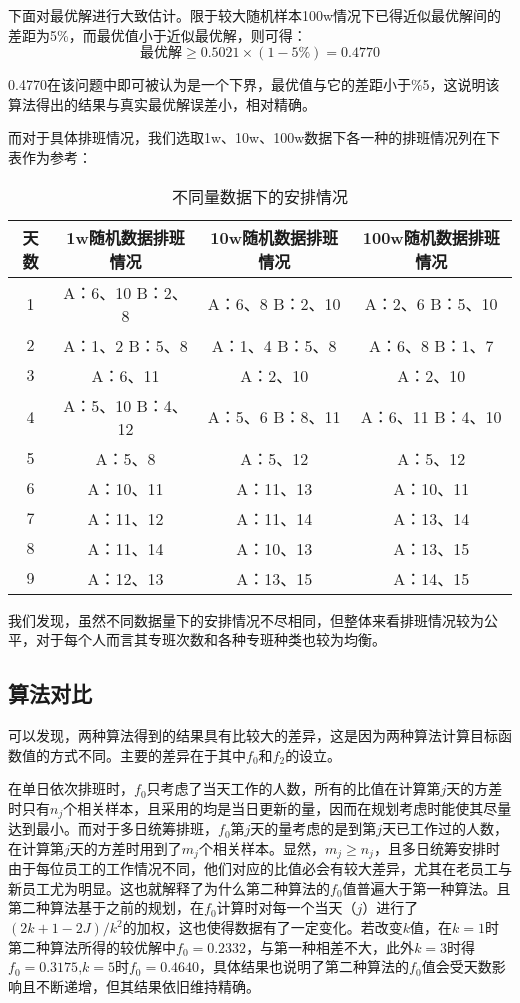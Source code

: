 \documentclass{article}
\begin{document}
	下面对最优解进行大致估计。限于较大随机样本100w情况下已得近似最优解间的差距为5\%，而最优值小于近似最优解，则可得：
	\begin{equation}
		\text{最优解}\geq 0.5021\times(1-5\%)=0.4770
	\end{equation}
	
	0.4770在该问题中即可被认为是一个下界，最优值与它的差距小于\%5，这说明该算法得出的结果与真实最优解误差小，相对精确。


	而对于具体排班情况，我们选取1w、10w、100w数据下各一种的排班情况列在下表作为参考：
	\begin{table}[!h]
		\centering
		\caption{不同量数据下的安排情况}
		\begin{tabular}{|c|c|c|c|}
			\hline
			天数 & 1w随机数据排班情况    & 10w随机数据排班情况  & 100w随机数据排班情况  \\
			\hline
			1  & A：6、10 B：2、8  & A：6、8 B：2、10 & A：2、6 B：5、10  \\
			2  & A：1、2 B：5、8   & A：1、4 B：5、8  & A：6、8 B：1、7   \\
			3  & A：6、11        & A：2、10       & A：2、10        \\
			4  & A：5、10 B：4、12 & A：5、6 B：8、11 & A：6、11 B：4、10 \\
			5  & A：5、8         & A：5、12       & A：5、12        \\
			6  & A：10、11       & A：11、13      & A：10、11       \\
			7  & A：11、12       & A：11、14      & A：13、14       \\
			8  & A：11、14       & A：10、13      & A：13、15       \\
			9  & A：12、13       & A：13、15      & A：14、15      \\
			\hline
		\end{tabular}
	\end{table}
	
	我们发现，虽然不同数据量下的安排情况不尽相同，但整体来看排班情况较为公平，对于每个人而言其专班次数和各种专班种类也较为均衡。
	
	\subsection{算法对比}
	可以发现，两种算法得到的结果具有比较大的差异，这是因为两种算法计算目标函数值的方式不同。主要的差异在于其中$f_0$和$f_2$的设立。
	
	在单日依次排班时，$f_0$只考虑了当天工作的人数，所有的比值在计算第$j$天的方差时只有$n_j$个相关样本，且采用的均是当日更新的量，因而在规划考虑时能使其尽量达到最小。而对于多日统筹排班，$f_0$第$j$天的量考虑的是到第$j$天已工作过的人数，在计算第$j$天的方差时用到了$m_j$个相关样本。显然，$m_j\geq n_j$，且多日统筹安排时由于每位员工的工作情况不同，他们对应的比值必会有较大差异，尤其在老员工与新员工尤为明显。这也就解释了为什么第二种算法的$f_0$值普遍大于第一种算法。且第二种算法基于之前的规划，在$f_0$计算时对每一个当天（$j$）进行了$(2k+1-2J)/k^2$的加权，这也使得数据有了一定变化。若改变$k$值，在$k=1$时第二种算法所得的较优解中$f_0=0.2332$，与第一种相差不大，此外$k=3$时得$f_0=0.3175$,$k=5$时$f_0=0.4640$，具体结果也说明了第二种算法的$f_0$值会受天数影响且不断递增，但其结果依旧维持精确。
	
\end{document}
